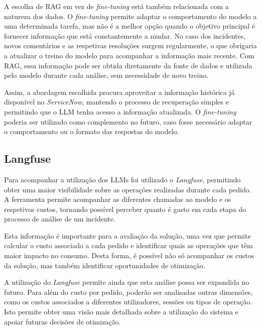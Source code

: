 		A escolha de \gls{RAG} em vez de \textit{fine-tuning} está também relacionada com a natureza dos dados. O \textit{fine-tuning} permite adaptar o comportamento do modelo a uma determinada tarefa, mas não é a melhor opção quando o objetivo principal é fornecer informação que está constantemente a mudar. No caso dos incidentes, novos comentários e as respetivas resoluções surgem regularmente, o que obrigaria a atualizar o treino do modelo para acompanhar a informação mais recente. Com \gls{RAG}, essa informação pode ser obtida diretamente da fonte de dados e utilizada pelo modelo durante cada análise, sem necessidade de novo treino.
		
		Assim, a abordagem escolhida procura aproveitar a informação histórica já disponível no \textit{ServiceNow}, mantendo o processo de recuperação simples e permitindo que o \gls{LLM} tenha acesso a informação atualizada. O \textit{fine-tuning} poderia ser utilizado como complemento no futuro, caso fosse necessário adaptar o comportamento ou o formato das respostas do modelo.
	
	\subsection{Langfuse}
		Para acompanhar a utilização dos \gls{LLM}s foi utilizado o \textit{Langfuse}, permitindo obter uma maior visibilidade sobre as operações realizadas durante cada pedido. A ferramenta permite acompanhar as diferentes chamadas ao modelo e os respetivos custos, tornando possível perceber quanto é gasto em cada etapa do processo de análise de um incidente.
		
		Esta informação é importante para a avaliação da solução, uma vez que permite calcular o custo associado a cada pedido e identificar quais as operações que têm maior impacto no consumo. Desta forma, é possível não só acompanhar os custos da solução, mas também identificar oportunidades de otimização.
		
		A utilização do \textit{Langfuse} permite ainda que esta análise possa ser expandida no futuro. Para além do custo por pedido, poderão ser analisadas outras dimensões, como os custos associados a diferentes utilizadores, sessões ou tipos de operação. Isto permite obter uma visão mais detalhada sobre a utilização do sistema e apoiar futuras decisões de otimização.

